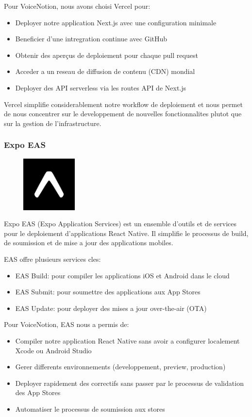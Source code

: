Pour VoiceNotion, nous avons choisi Vercel pour:
\begin{itemize}
    \item Deployer notre application Next.js avec une configuration minimale
    \item Beneficier d'une intregration continue avec GitHub
    \item Obtenir des aperçus de deploiement pour chaque pull request
    \item Acceder a un reseau de diffusion de contenu (CDN) mondial
    \item Deployer des API serverless via les routes API de Next.js
\end{itemize}

Vercel simplifie considerablement notre workflow de deploiement et nous permet de nous concentrer sur le developpement de nouvelles fonctionnalites plutot que sur la gestion de l'infrastructure.

\subsubsection{Expo EAS}
\begin{figure}
    \centering
    \includegraphics[width=0.25\textwidth]{assets/docs/logo_expo.png}
\end{figure}
Expo EAS (Expo Application Services) est un ensemble d'outils et de services pour le deploiement d'applications React Native. Il simplifie le processus de build, de soumission et de mise a jour des applications mobiles.

EAS offre plusieurs services cles:
\begin{itemize}
    \item EAS Build: pour compiler les applications iOS et Android dans le cloud
    \item EAS Submit: pour soumettre des applications aux App Stores
    \item EAS Update: pour deployer des mises a jour over-the-air (OTA)
\end{itemize}

Pour VoiceNotion, EAS nous a permis de:
\begin{itemize}
    \item Compiler notre application React Native sans avoir a configurer localement Xcode ou Android Studio
    \item Gerer differents environnements (developpement, preview, production)
    \item Deployer rapidement des correctifs sans passer par le processus de validation des App Stores
    \item Automatiser le processus de soumission aux stores
\end{itemize}


